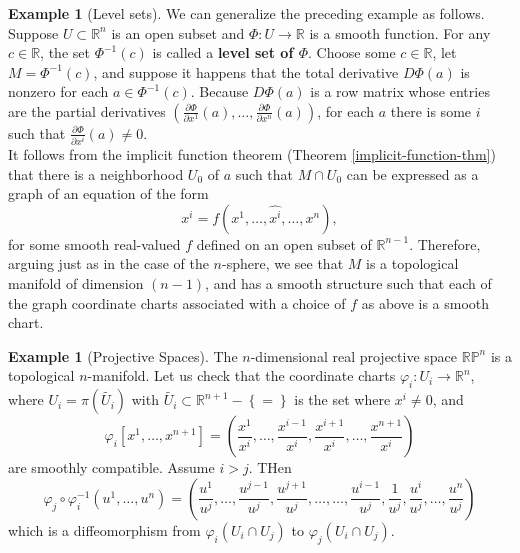 \documentclass[reqno]{amsart}
\theoremstyle{plain}%
\theoremstyle{definition}
\newtheorem{example}[theorem]{Example}
\theoremstyle{remark}
\begin{document}
        \begin{example}[Level sets]
            We can generalize the preceding example as follows. 
            Suppose $U \subset \mathbb{R}^{n}$ is an open subset and
            $\Phi  \colon U \to \mathbb{R}$ is a smooth function.
            For any $c \in \mathbb{R}$, the set $\Phi^{-1}(c)$ is called a
            \textbf{level set of $\Phi$}. Choose some $c \in \mathbb{R}$, let
            $M = \Phi^{-1}(c)$, and suppose it happens that the total
            derivative $D \Phi(a)$ is nonzero for each  $a \in \Phi^{-1}(c)$.
            Because $D \Phi(a)$ is a row matrix whose entries are the partial
            derivatives  $\left( \frac{\partial \Phi}{\partial x^{1}}(a),
            \ldots, \frac{\partial \Phi}{\partial x^{n}} (a) \right)$, for each
            $a$ there is some $i$ such that 
            $\frac{\partial \Phi}{\partial x^{i}} (a) \neq 0$.\\
            It follows from the implicit function theorem
            (Theorem \ref{implicit-function-thm}) that there is
            a neighborhood $U_0$ of $a$ such that $M \cap U_0$ can be expressed
            as a graph of  an equation of the form
            \[
            x^{i} = f\left( x^{1},\ldots, \hat{x^{i}},\ldots
            ,x^{n} \right),
            \] 
            for some smooth real-valued $f$ defined on an open subset of
            $\mathbb{R}^{n-1}$. Therefore, arguing just as in the case of the
            $n$-sphere, we see that $M$ is a topological manifold of dimension 
            $(n-1)$, and has a smooth structure such that each of the graph
            coordinate charts associated with a choice of $f$ as above is
            a smooth chart. 
        \end{example}

        \begin{example}[Projective Spaces]
            The $n$-dimensional real projective space
            $\mathbb{R}\mathbb{P}^{n}$ is a topological $n$-manifold. Let us
            check that the coordinate charts 
            $\varphi_i  \colon U_i \to \mathbb{R}^{n}$, where
            $U_i = \pi \left( \tilde{U_i} \right) $ with
            $\tilde{U_i} \subset \mathbb{R}^{n+1}-\left\{ = \right\} $ is the
            set where $x^{i} \neq 0$, and
            \[
            \varphi_i \left[ x^{1},\ldots, x^{n+1} \right] 
            = \left( \frac{x^{1}}{x^{i}},\ldots,
            \frac{x^{i-1}}{x^{i}}, \frac{x^{i+1}}{x^{i}}, \ldots,
            \frac{x^{n+1}}{x^{i}}
        \right) 
            \] 
            are smoothly compatible. Assume $i > j$. THen
            \[
            \varphi_j \circ \varphi_i^{-1} \left( u^{1},\ldots, u^{n}\right) 
            =
            \left( \frac{u^{1}}{u^{j}},\ldots,
                \frac{u^{j-1}}{u^{j}}, \frac{u^{j+1}}{u^{j}},\ldots,
                \ldots,
                \frac{u^{i-1}}{u^{j}}, \frac{1}{u^{j}},
                \frac{u^{i}}{u^{j}},\ldots,
                \frac{u^{n}}{u^{j}}
            \right) 
            \] 
            which is a diffeomorphism from
            $\varphi_i\left( U_i \cap U_j \right) $ to
            $\varphi_j \left( U_i \cap U_j \right) $.
        \end{example}
\end{document}
